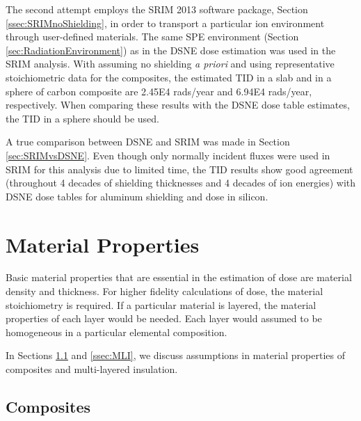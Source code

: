 \documentclass{hitec}
\begin{document}
The second attempt employs the SRIM 2013 software package, Section \ref{ssec:SRIMnoShielding}, in order to transport a particular ion environment through user-defined materials. The same SPE environment (Section \ref{sec:RadiationEnvironment}) as in the DSNE dose estimation was used in the SRIM analysis. With assuming no shielding \textit{a priori} and using representative stoichiometric data for the composites, the estimated TID in a slab and in a sphere of carbon composite are 2.45E4 rads/year and 6.94E4 rads/year, respectively. When comparing these results with the DSNE dose table estimates, the TID in a sphere should be used.

A true comparison between DSNE and SRIM was made in Section \ref{sec:SRIMvsDSNE}. Even though only normally incident fluxes were used in SRIM for this analysis due to limited time, the TID results show good agreement (throughout 4 decades of shielding thicknesses and 4 decades of ion energies) with DSNE dose tables for aluminum shielding and dose in silicon.

\newpage

\section{Material Properties}

Basic material properties that are essential in the estimation of dose are material density and thickness. For higher fidelity calculations of dose, the material stoichiometry is required. If a particular material is layered, the material properties of each layer would be needed. Each layer would assumed to be homogeneous in a particular elemental composition.

In Sections \ref{ssec:composites} and \ref{ssec:MLI}, we discuss assumptions in material properties of composites and multi-layered insulation.

\subsection{Composites}\label{ssec:composites}
\end{document}
